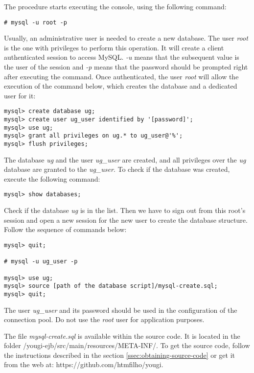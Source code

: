 \documentclass[envcountsame,envcountchap,letterpaper]{svmono}
\begin{document}
The procedure starts executing the console, using the following command:

\begin{verbatim}
# mysql -u root -p
\end{verbatim}

Usually, an administrative user is needed to create a new database. The user \textit{root} is the one with privileges to perform this operation. It will create a client authenticated session to access MySQL. \textit{-u} means that the subsequent value is the user of the session and \textit{-p} means that the password should be prompted right after executing the command. Once authenticated, the user \textit{root} will allow the execution of the command below, which creates the database and a dedicated user for it:

\begin{verbatim}
mysql> create database ug;
mysql> create user ug_user identified by '[password]';
mysql> use ug;
mysql> grant all privileges on ug.* to ug_user@'%';
mysql> flush privileges;
\end{verbatim}

The database \textit{ug} and the user \textit{ug\_user} are created, and all privileges over the \textit{ug} database are granted to the \textit{ug\_user}. To check if the database was created, execute the following command:

\begin{verbatim}
mysql> show databases;
\end{verbatim}

Check if the database \textit{ug} is in the list. Then we have to sign out from this root's session and open a new session for the new user to create the database structure. Follow the sequence of commands below:

\begin{verbatim}
mysql> quit;

# mysql -u ug_user -p

mysql> use ug;
mysql> source [path of the database script]/mysql-create.sql;
mysql> quit;
\end{verbatim}

The user \textit{ug\_user} and its password should be used in the configuration of the connection pool. Do not use the \textit{root} user for application purposes.

The file \textit{mysql-create.sql} is available within the source code. It is located in the folder /yougi-ejb/src/main/resources/META-INF/. To get the source code, follow the instructions described in the section \ref{ssec:obtaining-source-code} or get it from the web at: https://github.com/htmfilho/yougi.
\end{document}
